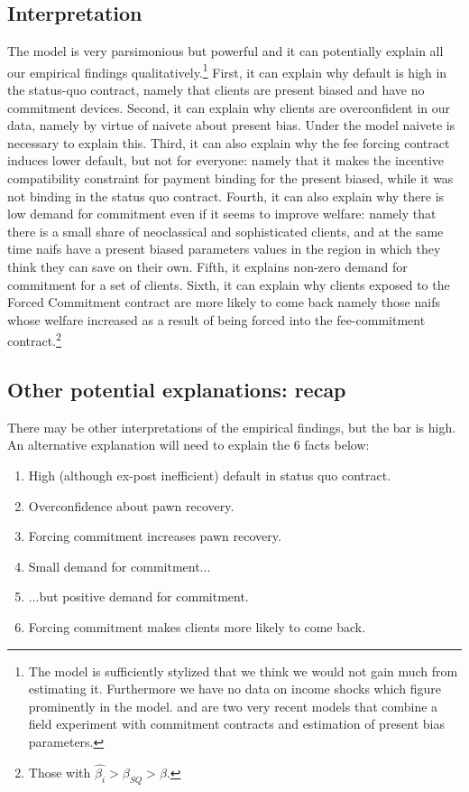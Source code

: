 \documentclass[oneside,11pt]{article}
\begin{document}
\subsection{Interpretation}

The model is very parsimonious but powerful and it can potentially explain all our empirical findings qualitatively.\footnote{The model is sufficiently stylized that we think we would not gain much from estimating it. Furthermore we have no data on income shocks which figure prominently in the model. \cite{Ted} and \cite{Aprajit} are two very recent models that combine a field experiment with commitment contracts and estimation of present bias parameters.} First, it can explain why default is high in the status-quo contract, namely that clients are present biased and have no commitment devices. Second, it can explain why clients are overconfident in our data, namely by virtue of naivete about present bias. Under the model naivete is necessary to explain this. Third, it can also explain why the fee forcing contract induces lower default, but not for everyone: namely that it makes the incentive compatibility constraint for payment binding for the present biased, while it was not binding in the status quo contract. Fourth, it can also explain why there is low demand for commitment even if it seems to improve welfare: namely that there is a small share of neoclassical and sophisticated clients, and at the same time naifs have a present biased parameters values in the region in which they think they can save on their own. Fifth, it explains non-zero demand for commitment for a set of clients. Sixth, it can explain why clients exposed to the Forced Commitment contract are more likely to come back namely those naifs whose welfare increased as a result of being forced into the fee-commitment contract.\footnote{Those with $\hat{\beta_i}>\beta_{SQ}>\beta$.}


\subsection{Other potential explanations: recap} \label{explanations_recap}

There may be other interpretations of the empirical findings, but the bar is high. An alternative explanation will need to explain the 6 facts below:

\begin{enumerate}
\itemsep0em 
\item High (although ex-post inefficient) default in status quo contract.
\item Overconfidence about pawn recovery.
\item Forcing commitment increases pawn recovery.
\item Small demand for commitment...
\item ...but positive demand for commitment.
\item Forcing commitment makes clients more likely to come back.
\end{enumerate}
\end{document}
